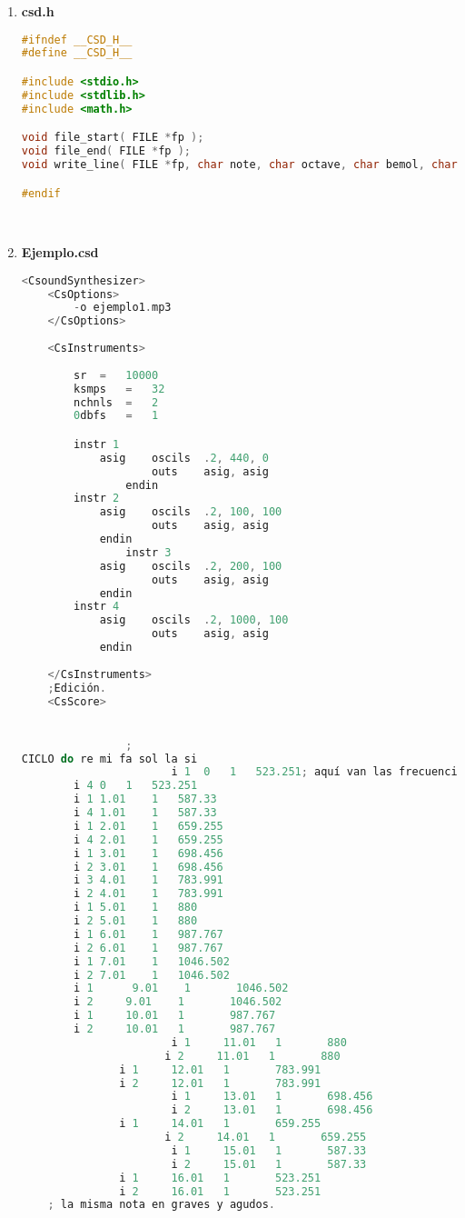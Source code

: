 \documentclass[12pt]{article}
\begin{document}
\begin{enumerate}
\begin{lstlisting}[language=C]
	frequency = frequency * pow( 2, octaven - 1 );

	fprintf( fp, "\t\ti1\t%f\t1\t%f\n", start, frequency );
}
\end{lstlisting}\\

\item {\bf csd.h}\\
\begin{lstlisting}[language=C]
#ifndef __CSD_H__
#define __CSD_H__

#include <stdio.h>
#include <stdlib.h>
#include <math.h>

void file_start( FILE *fp );
void file_end( FILE *fp );
void write_line( FILE *fp, char note, char octave, char bemol, char sharp, float start );

#endif
\end{lstlisting}\\


\item {\bf Ejemplo.csd}\\
\begin{lstlisting}[language=C]
<CsoundSynthesizer>	
	<CsOptions>
		-o ejemplo1.mp3
	</CsOptions>
	
	<CsInstruments>
	
		sr	=	10000
		ksmps	=	32
		nchnls	=	2
		0dbfs	=	1

		instr 1
			asig    oscils	.2, 440, 0
        			outs    asig, asig
                endin
		instr 2
			asig    oscils	.2, 100, 100
        			outs    asig, asig
	        endin
                instr 3
			asig    oscils	.2, 200, 100
        			outs    asig, asig
	        endin
		instr 4
			asig    oscils	.2, 1000, 100
        			outs    asig, asig
	        endin
	
	</CsInstruments>
	;Edición.
	<CsScore>


                ;
CICLO do re mi fa sol la si
                       i 1	0	1	523.251; aquí van las frecuencias. ejemplo este es un Do o C
		i 4	0	1	523.251
		i 1	1.01	1	587.33
		i 4	1.01	1	587.33
		i 1	2.01	1	659.255
		i 4	2.01	1	659.255
		i 1	3.01	1	698.456
		i 2	3.01	1	698.456
		i 3	4.01	1	783.991
		i 2	4.01	1	783.991
		i 1	5.01	1	880
		i 2	5.01	1	880
		i 1	6.01	1	987.767
		i 2	6.01	1	987.767
		i 1	7.01	1	1046.502
		i 2	7.01	1	1046.502
		i 1      9.01    1       1046.502
		i 2     9.01    1       1046.502
		i 1     10.01   1       987.767
		i 2     10.01   1       987.767
        	           i 1     11.01   1       880
                      i 2     11.01   1       880
	           i 1     12.01   1       783.991
	           i 2     12.01   1       783.991
        	           i 1     13.01   1       698.456
        	           i 2     13.01   1       698.456
	           i 1     14.01   1       659.255
                      i 2     14.01   1       659.255
        	           i 1     15.01   1       587.33
        	           i 2     15.01   1       587.33
	           i 1     16.01   1       523.251
	           i 2     16.01   1       523.251
	; la misma nota en graves y agudos.
	

\end{lstlisting}
\end{enumerate}
\end{document}
